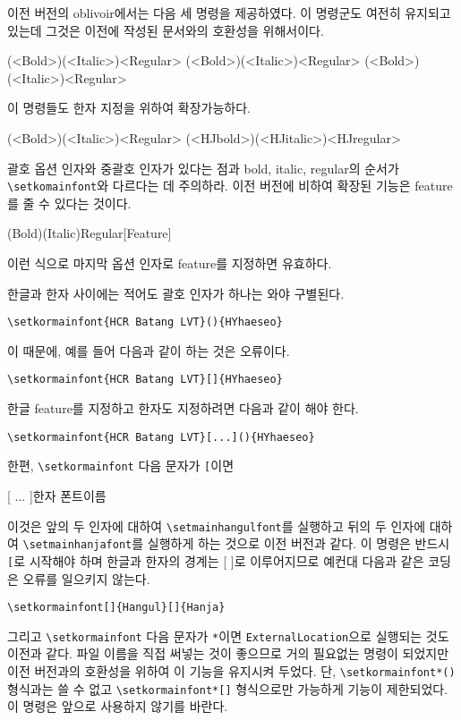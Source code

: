 \documentclass[
	12pt,
	a4paper,
	kosection,
	footnote,
	nobookmarks,
	microtype,
]{oblivoir}
\def\cs#1{\texttt{\textbackslash #1}}
\begin{document}
이전 버전의 oblivoir에서는 다음 세 명령을 제공하였다.
이 명령군도 여전히 유지되고 있는데 그것은 이전에 작성된 문서와의 호환성을 위해서이다.
\begin{boxedverbatim}
\setkormainfont(<Bold>)(<Italic>){<Regular>}
\setkorsansfont(<Bold>)(<Italic>){<Regular>}
\setkormonofont(<Bold>)(<Italic>){<Regular>}
\end{boxedverbatim}
이 명령들도 한자 지정을 위하여 확장가능하다.
\begin{boxedverbatim}
\setkormainfont(<Bold>)(<Italic>){<Regular>}%
               (<HJbold>)(<HJitalic>){<HJregular>}
\end{boxedverbatim}

괄호 옵션 인자와 중괄호 인자가 있다는 점과 bold, italic, regular의 순서가
\cs{setkomainfont}와 다르다는 데 주의하라.
이전 버전에 비하여 확장된 기능은 feature를 줄 수 있다는 것이다.
\begin{boxedverbatim}
\setkormainfont(Bold)(Italic){Regular}[Feature]
\end{boxedverbatim}
이런 식으로 마지막 옵션 인자로 feature를 지정하면 유효하다.

한글과 한자 사이에는 적어도 괄호 인자가 하나는 와야 구별된다.
\begin{verbatim}
\setkormainfont{HCR Batang LVT}(){HYhaeseo}
\end{verbatim}

이 때문에, 예를 들어 다음과 같이 하는 것은 오류이다.
\begin{verbatim}
\setkormainfont{HCR Batang LVT}[]{HYhaeseo}
\end{verbatim}
한글 feature를 지정하고 한자도 지정하려면 다음과 같이 해야 한다.
\begin{verbatim}
\setkormainfont{HCR Batang LVT}[...](){HYhaeseo}
\end{verbatim}

한편, \cs{setkormainfont} 다음 문자가 \texttt{[}이면 
\begin{boxedverbatim}
[ ... ]{한자 폰트이름}
\end{boxedverbatim}
이것은 앞의 두 인자에 대하여 \cs{setmainhangulfont}를 실행하고
뒤의 두 인자에 대하여 \cs{setmainhanjafont}를 실행하게 하는 것으로
이전 버전과 같다. 이 명령은 반드시 \texttt{[}로 시작해야 하며
한글과 한자의 경계는 [ ]로 이루어지므로 예컨대
다음과 같은 코딩은 오류를 일으키지 않는다.
\begin{verbatim}
\setkormainfont[]{Hangul}[]{Hanja}
\end{verbatim}

그리고 \cs{setkormainfont} 다음 문자가 \texttt{*}이면
\texttt{ExternalLocation}으로 실행되는 것도 이전과 같다.
파일 이름을 직접 써넣는 것이 좋으므로 거의 필요없는 명령이 되었지만
이전 버전과의 호환성을 위하여 이 기능을 유지시켜 두었다.
단, \cs{setkormainfont*()} 형식과는 쓸 수 없고 \cs{setkormainfont*[]} 형식으로만 
가능하게 기능이 제한되었다. 이 명령은 앞으로 사용하지 않기를 바란다.
\begin{boxedverbatim}
\end{boxedverbatim}
\end{document}
